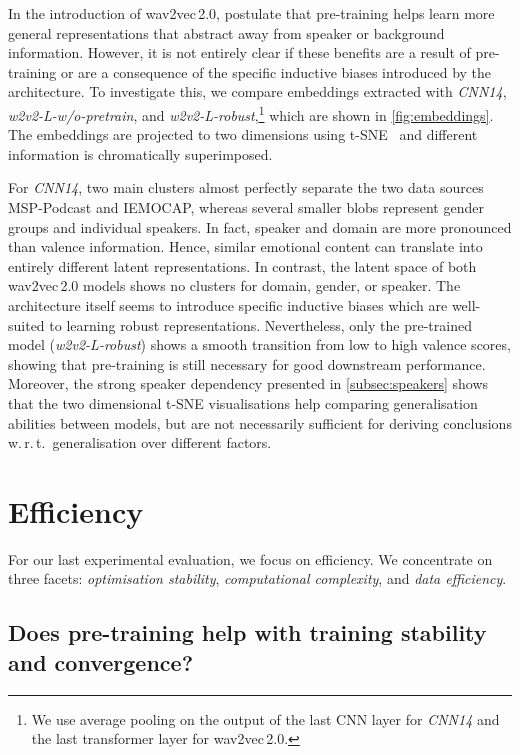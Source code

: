 \documentclass{article}
\newcommand\cnn{\mbox{\emph{CNN14}}}
\newcommand\wrobust{\mbox{\emph{w2v2-L-robust}}}
\newcommand\wwopre{\mbox{\emph{w2v2-L-w/o-pretrain}}}
\newcommand\msppodcast{\mbox{MSP-Podcast}}
\newcommand\iemocap{\mbox{IEMOCAP}}
\newcommand{\wtov}{wav2vec\,2.0}
\newcommand{\wrt}{w.\,r.\,t.\ }
\begin{document}
In the introduction of {\wtov}, \citet{baevski2020wav2vec} postulate
that  pre-training helps learn more general representations
that abstract away from speaker or background information.
However, it is not entirely clear
if these benefits are a result of pre-training
or are a consequence of the specific inductive biases introduced by the architecture.
To investigate this,
we compare embeddings extracted with {\cnn}, {\wwopre}, and {\wrobust},\footnote{
We use average pooling on the output of the last CNN layer for {\cnn}
and the last transformer layer for {\wtov}.
}
which are shown in \cref{fig:embeddings}.
The embeddings are projected to two dimensions using t-SNE~\citep{maaten2008tsne}
and different information is chromatically superimposed.

For {\cnn}, two main clusters almost perfectly separate the two data sources {\msppodcast} and {\iemocap},
whereas several smaller blobs represent gender groups and individual speakers.
In fact, speaker and domain are more pronounced than valence information. 
Hence, similar emotional content can translate into entirely different latent representations. 
In contrast,
the latent space of both {\wtov} models shows no clusters for domain, gender, or speaker.
The architecture itself seems to introduce specific inductive biases
which are well-suited to learning robust representations.
Nevertheless, only the pre-trained model ({\wrobust}) shows a smooth transition from low to high valence scores,
showing that pre-training is still necessary for good downstream performance.
Moreover, the strong speaker dependency presented in \cref{subsec:speakers}
shows that the two dimensional t-SNE visualisations help comparing generalisation abilities between models,
but are not necessarily sufficient for deriving conclusions \wrt generalisation over different factors.





\section{Efficiency}
\label{sec:efficiency}

For our last experimental evaluation,
we focus on efficiency.
We concentrate on three facets:
\emph{optimisation stability},
\emph{computational complexity},
and \emph{data efficiency}.






\subsection{Does pre-training help with training stability and convergence?}
\label{subsec:stability}
\end{document}
